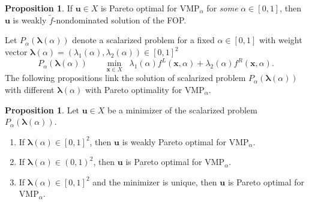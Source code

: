 \documentclass{article}
\theoremstyle{definition}
\newtheorem{prop}[maar]{Proposition}
\begin{document}
\begin{prop}\cite{Ant}\label{prop:WeaklyParetoFamilyToF}
If $\boldsymbol u\in X$ is Pareto optimal for \(\text{VMP}_{\alpha}\) for
\emph{some} $\alpha\in[0,1]$, then $\boldsymbol u$ is weakly \(\tilde f\)-nondominated solution of the FOP.
\end{prop}

Let $P_{\alpha}({\boldsymbol\lambda}(\alpha))$ denote a scalarized
problem for a fixed $\alpha\in[0,1]$ with weight vector
${\boldsymbol\lambda}(\alpha)=({\lambda_1}(\alpha),{\lambda_2}(\alpha))\in[0,1]^{2}$
$$
  P_{\alpha}({\boldsymbol\lambda}(\alpha))\qquad
  \min_{\boldsymbol x\in X}\;\; {\lambda_1}(\alpha) f^{L}(\boldsymbol x,\alpha)+
                                  {\lambda_2}(\alpha)f^{R}(\boldsymbol x,\alpha).
$$
The following propositions link the solution of scalarized problem $P_{\alpha}({\boldsymbol\lambda}(\alpha))$ with different ${\boldsymbol\lambda}(\alpha)$ with Pareto optimality for \(\text{VMP}_{\alpha}\).

\begin{prop}\cite{Ant}\label{prop:scalarToParetoFixed}
Let $\boldsymbol u\in X$ be a minimizer of the scalarized problem 
$P_{\alpha}({\boldsymbol\lambda}(\alpha))$.
\begin{enumerate}
  \item If ${\boldsymbol\lambda}(\alpha)\in[0,1]^{2}$,
        then $\boldsymbol u$ is weakly Pareto optimal for
        \(\text{VMP}_{\alpha}\).
  \item If ${\boldsymbol\lambda}(\alpha)\in(0,1)^{2}$,
        then $\boldsymbol u$ is Pareto optimal for
        \(\text{VMP}_{\alpha}\).
  \item If ${\boldsymbol\lambda}(\alpha)\in[0,1]^{2}$ and the minimizer
        is unique, then $\boldsymbol u$ is Pareto optimal for
        \(\text{VMP}_{\alpha}\).
\end{enumerate}
\end{prop}
\end{document}
